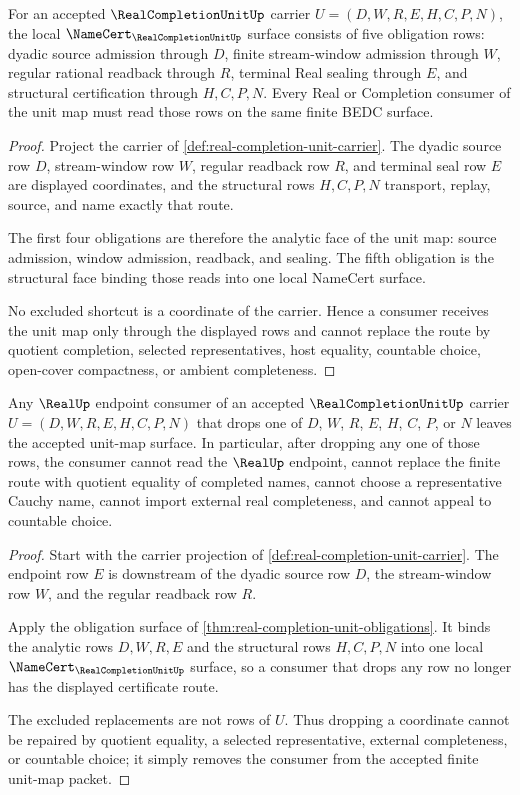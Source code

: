 \begin{theorem}
\label{thm:real-completion-unit-obligations}
For an accepted $\RealCompletionUnitUp$ carrier $U=(D,W,R,E,H,C,P,N)$, the local $\NameCert_{\RealCompletionUnitUp}$ surface consists of five obligation rows: dyadic source admission through $D$, finite stream-window admission through $W$, regular rational readback through $R$, terminal Real sealing through $E$, and structural certification through $H,C,P,N$. Every Real or Completion consumer of the unit map must read those rows on the same finite BEDC surface.
\end{theorem}
\begin{proof}
Project the carrier of \autoref{def:real-completion-unit-carrier}. The dyadic source row $D$, stream-window row $W$, regular readback row $R$, and terminal seal row $E$ are displayed coordinates, and the structural rows $H,C,P,N$ transport, replay, source, and name exactly that route.

The first four obligations are therefore the analytic face of the unit map: source admission, window admission, readback, and sealing. The fifth obligation is the structural face binding those reads into one local NameCert surface.

No excluded shortcut is a coordinate of the carrier. Hence a consumer receives the unit map only through the displayed rows and cannot replace the route by quotient completion, selected representatives, host equality, countable choice, open-cover compactness, or ambient completeness.
\end{proof}

\begin{theorem}
\label{thm:real-completion-unit-nonescape}
Any $\RealUp$ endpoint consumer of an accepted $\RealCompletionUnitUp$ carrier $U=(D,W,R,E,H,C,P,N)$ that drops one of $D$, $W$, $R$, $E$, $H$, $C$, $P$, or $N$ leaves the accepted unit-map surface. In particular, after dropping any one of those rows, the consumer cannot read the $\RealUp$ endpoint, cannot replace the finite route with quotient equality of completed names, cannot choose a representative Cauchy name, cannot import external real completeness, and cannot appeal to countable choice.
\end{theorem}
\begin{proof}
Start with the carrier projection of \autoref{def:real-completion-unit-carrier}. The endpoint row $E$ is downstream of the dyadic source row $D$, the stream-window row $W$, and the regular readback row $R$.

Apply the obligation surface of \autoref{thm:real-completion-unit-obligations}. It binds the analytic rows $D,W,R,E$ and the structural rows $H,C,P,N$ into one local $\NameCert_{\RealCompletionUnitUp}$ surface, so a consumer that drops any row no longer has the displayed certificate route.

The excluded replacements are not rows of $U$. Thus dropping a coordinate cannot be repaired by quotient equality, a selected representative, external completeness, or countable choice; it simply removes the consumer from the accepted finite unit-map packet.
\end{proof}

